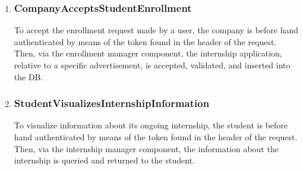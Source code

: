 \begin{enumerate}[label=\textbf{RV\arabic* -}]
\item \subsubsection{CompanyAcceptsStudentEnrollment}

To accept the enrollment request made by a user, the company is before hand authenticated by means of the token found in the header of the request.
Then, via the enrollment manager component, the internship application, relative to a specific advertisement, is accepted, validated, and inserted into the DB.

\begin{figure}[H]
    \centering
\end{figure}

\item \subsubsection{StudentVisualizesInternshipInformation}

To visualize information about its ongoing internship, the student is before hand authenticated by means of the token found in the header of the request.
Then, via the internship manager component, the information about the internship is queried and returned to the student.

\begin{figure}[H]
    \centering
\end{figure}


\end{enumerate}
